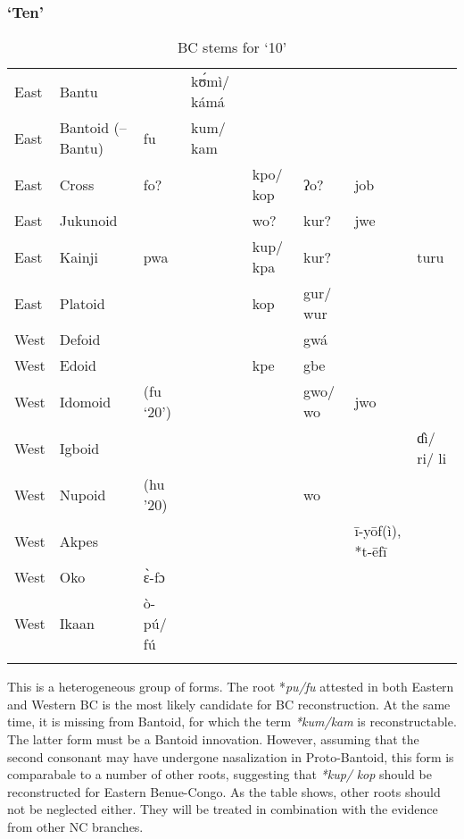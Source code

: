\subsubsection{‘Ten’}\label{sec:3.1.4.8}
\begin{table}
\caption{\label{tab:3:61}BC stems for `10'}


\begin{tabularx}{\textwidth}{ll lQQlQQ}
\lsptoprule

East & {Bantu} &   & k{\'{ʊ}}mì/ kámá &   &   &   &  \\
East & {Bantoid} {(–Bantu)} & fu & kum/ kam &   &   &   &  \\
East & {Cross} & fo? &   & kpo/ kop & ʔo? & job &  \\
East & {Jukunoid} &   &   & wo? & kur? & jwe &  \\
East & {Kainji} & pwa &   & kup/ kpa & kur? &   & turu\\
East & {Platoid} &   &   & kop & gur/ wur &   &  \\
West & {Defoid} &   &   &   & gwá &   &  \\
West & {Edoid} &   &   & kpe & gbe &   &  \\
West & {Idomoid} & (fu `20') &   &   & gwo/ wo & jwo &  \\
West & {Igboid} &   &   &   &   &   & ɗì/ ri/ li\\
West & {Nupoid} &  (hu ’20) &   &   & wo &   &  \\
West & {Akpes} &   &   &   &   & {\={i}}-y{\={o}}f(ì), *t-{\={e}}f{\={i}} &  \\
West & {Oko} & {\`{ɛ}}-fɔ &   &   &   &   &  \\
West & {Ikaan} & ò-p{\'{u}}/ f{\'{u}} &   &   &   &   &  \\
\lspbottomrule
\end{tabularx}
\end{table}

This is a heterogeneous group of forms. The root *\textit{pu/fu} attested in both Eastern and Western BC is the most likely candidate for BC reconstruction. At the same time, it is missing from Bantoid, for which the term \textit{*kum/kam} is reconstructable. The latter form must be a Bantoid innovation. However, assuming that the second consonant may have undergone nasalization in Proto-Bantoid, this form is comparabale to a number of other roots, suggesting that \textit{*kup/} \textit{kop} should be reconstructed for Eastern Benue-Congo. As the table shows, other roots should not be neglected either. They will be treated in combination with the evidence from other NC branches. 

